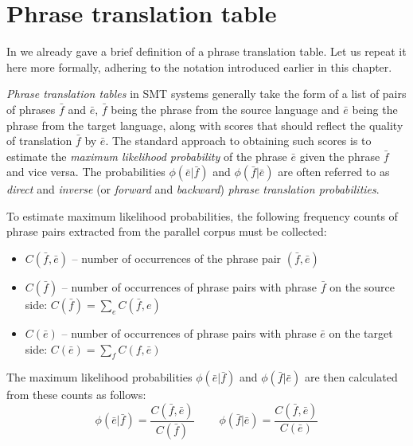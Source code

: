 \section{Phrase translation table}
\label{sec:phrase-translation-table}


In  we already gave a brief definition of a phrase
translation table. Let us repeat it here more formally, adhering
to the notation introduced earlier in this chapter.

\emph{Phrase translation tables} in SMT systems generally take the form of a list of
pairs of phrases $\bar{f}$ and $\bar{e}$, $\bar{f}$ being the phrase from the source
language and $\bar{e}$ being the phrase from the target language, along with scores
that should reflect the quality of translation $\bar{f}$ by $\bar{e}$.
The standard approach to obtaining such scores is to estimate the \emph{maximum likelihood
probability} of the phrase $\bar{e}$ given the phrase $\bar{f}$ and vice versa.
The probabilities $\phi(\bar{e}|\bar{f})$ and $\phi(\bar{f}|\bar{e})$ are often
referred to as \emph{direct} and \emph{inverse} (or \emph{forward} and \emph{backward})
\emph{phrase translation probabilities}.

To estimate maximum likelihood probabilities, the following frequency counts
of phrase pairs extracted from the parallel corpus must be collected:
\begin{itemize}
  \item $C(\bar{f},\bar{e})$ -- number of occurrences of the phrase pair $(\bar{f},\bar{e})$
  \item $C(\bar{f})$ -- number of occurrences of phrase pairs with phrase $\bar{f}$ on the source side:
    $C(\bar{f}) = \sum_{e}{C(\bar{f},e)}$
  \item $C(\bar{e})$ -- number of occurrences of phrase pairs with phrase $\bar{e}$ on the target side:
    $C(\bar{e}) = \sum_{f}{C(f,\bar{e})}$
\end{itemize}

The maximum likelihood probabilities $\phi(\bar{e}|\bar{f})$ and
$\phi(\bar{f}|\bar{e})$ are then calculated from these counts as follows:
\begin{equation}
  \phi(\bar{e}|\bar{f}) = \frac{C(\bar{f},\bar{e})}{C(\bar{f})}
  ~~~~~~~~~~ %
  \phi(\bar{f}|\bar{e}) = \frac{C(\bar{f},\bar{e})}{C(\bar{e})}
\end{equation}

